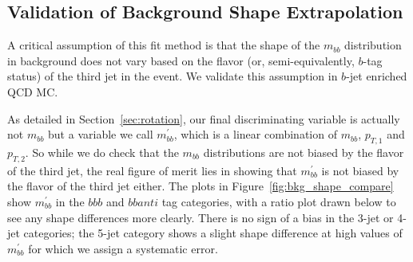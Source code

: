 %



\subsection{Validation of Background Shape Extrapolation}
A critical assumption of this fit method is that the shape of the $m_{bb}$ distribution
in background does not vary based on the flavor (or, semi-equivalently, $b$-tag status)
of the third jet in the event.  We validate this assumption in $b$-jet enriched 
QCD MC.

As detailed in Section~\ref{sec:rotation}, our final discriminating variable is actually
not $m_{bb}$ but a variable we call $m_{bb}^{'}$, which is a linear combination of $m_{bb}$, $p_{T,1}$ and $p_{T,2}$.  So while we
do check that the $m_{bb}$ distributions are not biased by the flavor of the third jet,
the real figure of merit lies in showing that $m_{bb}^{'}$ is not biased by the
flavor of the third jet either.  The plots in Figure~\ref{fig:bkg_shape_compare}
show $m_{bb}^{'}$ in the $bbb$ and $bbanti$ tag categories, with a ratio plot drawn below
to see any shape differences more clearly.  There is no sign of a bias in the 3-jet
or 4-jet categories; the 5-jet category shows a slight shape difference at high values
of $m_{bb}^{'}$ for which we assign a systematic error.

